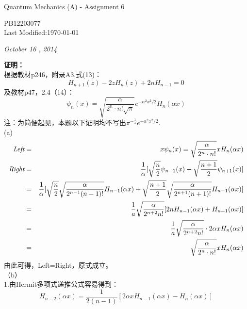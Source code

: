 \documentclass[a4paper]{article}
\begin{document}
    \begin{center}
        \textsf{\LARGE{Quantum Mechanics (A) - Assignment 6}}\\[20pt]
    \end{center}

    \begin{CJK*}{UTF8}{kai}
        \begin{flushright}
            \small PB12203077\\
            \small Last Modified:\today
        \end{flushright}
    \end{CJK*}

    \noindent\Large{\emph{October 16 , 2014}}\\[15pt]
    \begin{CJK*}{UTF8}{song}
     \textbf{证明：}\\[12pt]
    {
    根据教材p246，附录A3,式(13)：
    $$H_{n + 1}(z) - 2 z H_{n}(z) + 2 n H_{n - 1} = 0$$
    及教材p47，2.4（14）：
    $$\psi_{n}(x) = \sqrt{\frac{\alpha}{2^{n}\cdot n!\sqrt{\pi}}}e^{-\alpha^{2}x^{2} / 2}H_{n}(\alpha x)$$
    注：为简便起见，本题以下证明均不写出$\displaystyle \pi^{-\frac{1}{4}}e^{-\alpha^{2}x^{2} / 2}$.\\
    (a)
    \begin{eqnarray}
        \emph{Left}  & = & x\psi_{n}(x)=\sqrt{\frac{\alpha}{2^{n}\cdot n!}}x H_{n}(\alpha x)\nonumber\\
        \emph{Right} & = & \frac{1}{\alpha}[\sqrt{\frac{n}{2}}\psi_{n-1}(x) + \sqrt{\frac{n + 1}{2}}\psi_{n+1}(x)]\nonumber\\
          & = & \frac{1}{\alpha}[\sqrt{\frac{n}{2}}\sqrt{\frac{\alpha}{2^{n-1}(n-1)!}}H_{n-1}(\alpha x)
            + \sqrt{\frac{n+1}{2}}\sqrt{\frac{\alpha}{2^{n+1}(n+1)!}}H_{n-1}(\alpha x)]\nonumber\\
          & = & \frac{1}{a}\sqrt{\frac{\alpha}{2^{n+2} n!}}[2 n H_{n-1}(\alpha x) + H_{n+1}(\alpha x)] \nonumber\\
          & = & \frac{1}{a}\sqrt{\frac{\alpha}{2^{n+2} n!}}\cdot 2\alpha x H_{n}(\alpha x)\nonumber\\
          & = & \sqrt{\frac{\alpha}{2^{n}\cdot n!}}x H_{n}(\alpha x)\nonumber
    \end{eqnarray}
    由此可得，Left=Right，原式成立。\\[8pt]
    （b）\\
    1.由Hermit多项式递推公式容易得到：\\
    $$H_{n-2}(\alpha x) = \frac{1}{2(n-1)}[2\alpha x H_{n-1}(\alpha x) - H_{n}(\alpha x)]$$
}
\end{CJK*}
\end{document}
